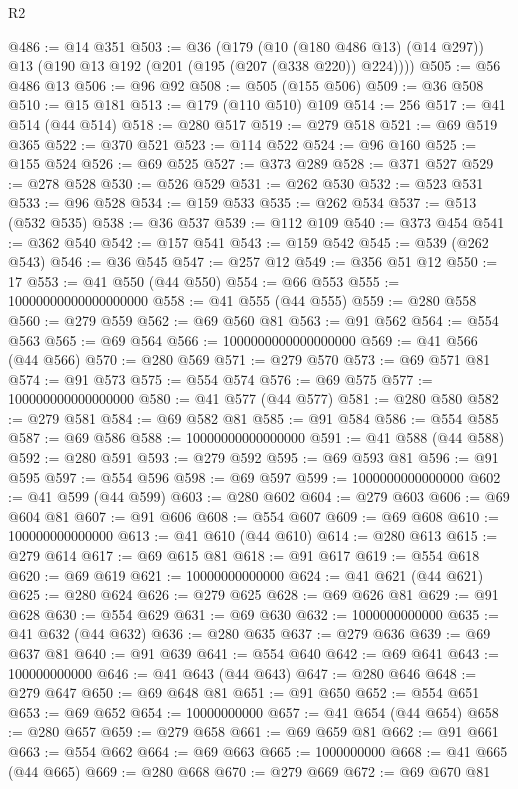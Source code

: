 \begin{lexlean}{R2}
\begin{coremodule}
@486 := @14 @351
@503 := @36
    (@179
      (@10 (@180 @486 @13) (@14 @297))
      @13
      (@190 @13 @192 (@201 (@195 (@207 (@338 @220)) @224))))
@505 := @56 @486 @13
@506 := @96 @92
@508 := @505 (@155 @506)
@509 := @36 @508
@510 := @15 @181
@513 := @179 (@110 @510) @109
@514 := 256
@517 := @41 @514 (@44 @514)
@518 := @280 @517
@519 := @279 @518
@521 := @69 @519 @365
@522 := @370 @521
@523 := @114 @522
@524 := @96 @160
@525 := @155 @524
@526 := @69 @525
@527 := @373 @289
@528 := @371 @527
@529 := @278 @528
@530 := @526 @529
@531 := @262 @530
@532 := @523 @531
@533 := @96 @528
@534 := @159 @533
@535 := @262 @534
@537 := @513 (@532 @535)
@538 := @36 @537
@539 := @112 @109
@540 := @373 @454
@541 := @362 @540
@542 := @157 @541
@543 := @159 @542
@545 := @539 (@262 @543)
@546 := @36 @545
@547 := @257 @12
@549 := @356 @51 @12
@550 := 17
@553 := @41 @550 (@44 @550)
@554 := @66 @553
@555 := 10000000000000000000
@558 := @41 @555 (@44 @555)
@559 := @280 @558
@560 := @279 @559
@562 := @69 @560 @81
@563 := @91 @562
@564 := @554 @563
@565 := @69 @564
@566 := 1000000000000000000
@569 := @41 @566 (@44 @566)
@570 := @280 @569
@571 := @279 @570
@573 := @69 @571 @81
@574 := @91 @573
@575 := @554 @574
@576 := @69 @575
@577 := 100000000000000000
@580 := @41 @577 (@44 @577)
@581 := @280 @580
@582 := @279 @581
@584 := @69 @582 @81
@585 := @91 @584
@586 := @554 @585
@587 := @69 @586
@588 := 10000000000000000
@591 := @41 @588 (@44 @588)
@592 := @280 @591
@593 := @279 @592
@595 := @69 @593 @81
@596 := @91 @595
@597 := @554 @596
@598 := @69 @597
@599 := 1000000000000000
@602 := @41 @599 (@44 @599)
@603 := @280 @602
@604 := @279 @603
@606 := @69 @604 @81
@607 := @91 @606
@608 := @554 @607
@609 := @69 @608
@610 := 100000000000000
@613 := @41 @610 (@44 @610)
@614 := @280 @613
@615 := @279 @614
@617 := @69 @615 @81
@618 := @91 @617
@619 := @554 @618
@620 := @69 @619
@621 := 10000000000000
@624 := @41 @621 (@44 @621)
@625 := @280 @624
@626 := @279 @625
@628 := @69 @626 @81
@629 := @91 @628
@630 := @554 @629
@631 := @69 @630
@632 := 1000000000000
@635 := @41 @632 (@44 @632)
@636 := @280 @635
@637 := @279 @636
@639 := @69 @637 @81
@640 := @91 @639
@641 := @554 @640
@642 := @69 @641
@643 := 100000000000
@646 := @41 @643 (@44 @643)
@647 := @280 @646
@648 := @279 @647
@650 := @69 @648 @81
@651 := @91 @650
@652 := @554 @651
@653 := @69 @652
@654 := 10000000000
@657 := @41 @654 (@44 @654)
@658 := @280 @657
@659 := @279 @658
@661 := @69 @659 @81
@662 := @91 @661
@663 := @554 @662
@664 := @69 @663
@665 := 1000000000
@668 := @41 @665 (@44 @665)
@669 := @280 @668
@670 := @279 @669
@672 := @69 @670 @81

\end{coremodule}
\end{lexlean}
